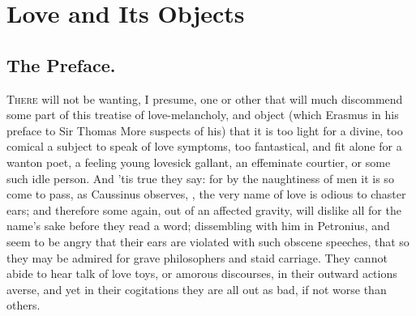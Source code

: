 \chapter{Love and Its Objects}
{
\section{The Preface.}

\lettrine{T}{here} will not be wanting, I presume, one or other that will much
discommend some part of this treatise of love-melancholy, and object
(which Erasmus in his preface to Sir Thomas More suspects of his)
that it is too light for a divine, too comical a subject to speak of
love symptoms, too fantastical, and fit alone for a wanton poet, a
feeling young lovesick gallant, an effeminate courtier, or some such
idle person. And 'tis true they say: for by the naughtiness of men it
is so come to pass, as  Caussinus observes, , the very name of love is odious to
chaster ears; and therefore some again, out of an affected gravity,
will dislike all for the name's sake before they read a word;
dissembling with him in Petronius, and seem to be angry that
their ears are violated with such obscene speeches, that so they may be
admired for grave philosophers and staid carriage. They cannot abide to
hear talk of love toys, or amorous discourses,  in
their outward actions averse, and yet in their cogitations they are all
out as bad, if not worse than others.


}
